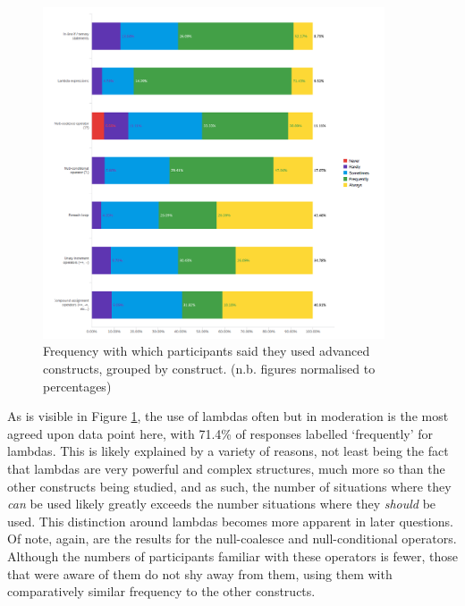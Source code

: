 \documentclass{article}
\begin{document}
            \begin{figure}[htbp]
                \centering
                \includegraphics[width=0.9\textwidth]{freqUse}
                \caption{Frequency with which participants said they used advanced constructs, grouped by construct. (n.b. figures normalised to percentages)}
                \label{fig:freqUse}
            \end{figure}

            As is visible in Figure \ref{fig:freqUse}, the use of lambdas often but in moderation is the most agreed upon data point here, with 71.4\% of responses labelled `frequently' for lambdas. This is likely explained by a variety of reasons, not least being the fact that lambdas are very powerful and complex structures, much more so than the other constructs being studied, and as such, the number of situations where they \emph{can} be used likely greatly exceeds the number situations where they \emph{should} be used. This distinction around lambdas becomes more apparent in later questions.
            Of note, again, are the results for the null-coalesce and null-conditional operators. Although the numbers of participants familiar with these operators is fewer, those that were aware of them do not shy away from them, using them with comparatively similar frequency to the other constructs.
\end{document}
